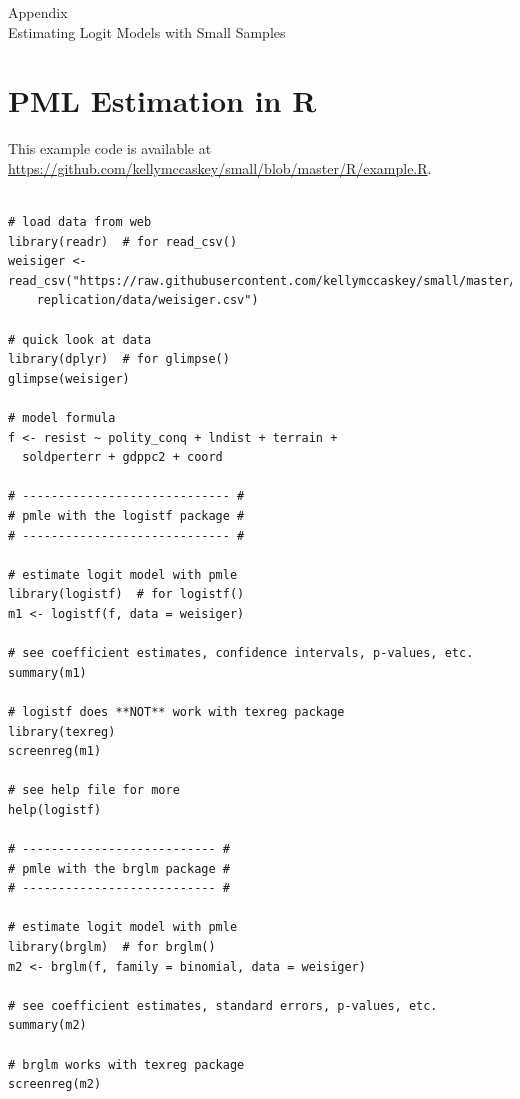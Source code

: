 \documentclass[12pt]{article}
\begin{document}
\newpage
\begin{appendix}
\begin{center}
{\LARGE Appendix}\\
\vspace{3mm}
{\large Estimating Logit Models with Small Samples}\\\vspace{2mm}
\end{center}

\section{PML Estimation in R}\label{sec:pmle-in-R}

This example code is available at \href{https://github.com/kellymccaskey/small/blob/master/R/example.R}{https://github.com/kellymccaskey/small/blob/master/R/example.R}.

\begin{footnotesize}
\begin{verbatim}

# load data from web
library(readr)  # for read_csv()
weisiger <- read_csv("https://raw.githubusercontent.com/kellymccaskey/small/master/weisiger-
	replication/data/weisiger.csv")

# quick look at data
library(dplyr)  # for glimpse()
glimpse(weisiger)

# model formula
f <- resist ~ polity_conq + lndist + terrain +
  soldperterr + gdppc2 + coord

# ----------------------------- #
# pmle with the logistf package #
# ----------------------------- #

# estimate logit model with pmle
library(logistf)  # for logistf()
m1 <- logistf(f, data = weisiger)

# see coefficient estimates, confidence intervals, p-values, etc.
summary(m1)

# logistf does **NOT** work with texreg package
library(texreg)
screenreg(m1)

# see help file for more
help(logistf)

# --------------------------- #
# pmle with the brglm package #
# --------------------------- #

# estimate logit model with pmle
library(brglm)  # for brglm()
m2 <- brglm(f, family = binomial, data = weisiger)

# see coefficient estimates, standard errors, p-values, etc.
summary(m2)

# brglm works with texreg package
screenreg(m2)


\end{verbatim}
\end{footnotesize}
\end{appendix}
\end{document}
